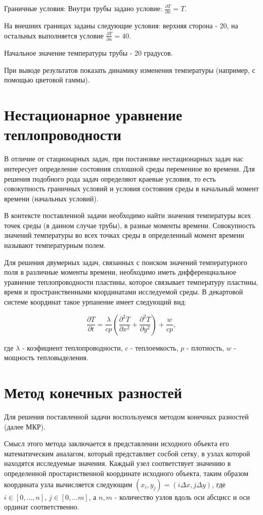 \documentclass[12pt, a4paper]{article}
\begin{document}
    Граничные условия:
    Внутри трубы задано условие: $\frac{\partial T}{\partial n} = T$.
    
    На внешних границах заданы следующие условия: верхняя сторона - 20, на остальных выполняется условие $\frac{\partial T}{\partial n} = 40$.
    
    Начальное значение температуры трубы - 20 градусов.
    
    При выводе результатов показать динамику изменения температуры (например, с помощью цветовой гаммы).
	
	\section{Нестационарное уравнение теплопроводности}
	
	В отличие от стационарных задач, при постановке нестационарных задач нас интересует определение состояния сплошной среды переменное во времени. Для решения подобного рода задач определяют краевые условия, то есть совокупность граничных условий и условия состояния среды в начальный момент времени (начальных условий).
	
	В контексте поставленной задачи необходимо найти значения температуры всех точек среды (в данном случае трубы), в разные моменты времени. Совокупность значений температуры во всех точках среды в определенный момент времени называют температурным полем.
	
	Для решения двумерных задач, связанных с поиском значений температурного поля в различные моменты времени, необходимо иметь дифференциальное уравнение теплопроводности пластины, которое связывает температуру пластины, время и пространственными координатами исследуемой среды. В декартовой системе координат такое урпанение имеет следующий вид:
	
	\[
	\frac{\partial T}{\partial t} = \frac{\lambda}{cp}\left( \frac{\partial^2 T}{\partial x^2}  + \frac{\partial^2 T}{\partial y^2} \right) + \frac{w}{cp},
	\]
	
	где $\lambda$ - коэфициент теплопроводности, $c$ - теплоемкость, $p$ - плотность, $w$ - мощность тепловыделения.
	
	\section{Метод конечных разностей}
	Для решения поставленной задачи воспользуемся методом конечных разностей (далее МКР).
	
	Смысл этого метода заключается в представлении исходного объекта его математическим аналагом, который представляет сосбой сетку, в узлах которой находятся исследуемые значения. Каждый узел соответствует значению в определенной простарнственной координате исходного объекта, таким образом координата узла вычисляется следующим $(x_i, y_j) = (i\Delta x, j\Delta y)$, где $i \in [0, ..., n]$, $j \in [0, ... m]$, а $n, m$ - количество узлов вдоль оси абсцисс и оси ординат соответственно.
	
\end{document}
